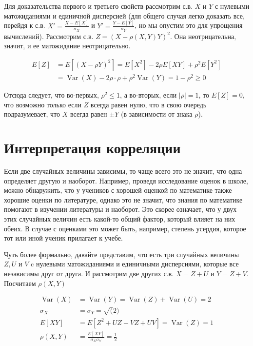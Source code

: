 \documentclass[12pt]{article}
\DeclareMathOperator{\Var}{Var}
\begin{document}
Для доказательства первого и третьего свойств рассмотрим с.в. $X$ и $Y$ с нулевыми матожиданиями и единичной дисперсией (для общего случая легко доказать все, перейдя к с.в. $X' = \frac{X - E[X]}{\sigma_X}$ и $Y' = \frac{Y - E[Y]}{\sigma_Y}$, но мы опустим это для упрощения вычислений). Рассмотрим с.в. $Z = (X - \rho(X, Y)Y)^2$. Она неотрицательна, значит, и ее матожидание неотрицательно.

\begin{align*}
  E[Z] &= E[(X - \rho Y)^2] = E[X^2] - 2\rho E[XY] + \rho^2 E[Y^2] \\
       &= \Var(X) - 2 \rho \cdot \rho + \rho^2 \Var(Y) = 1 - \rho^2 \ge 0   
\end{align*}

Отсюда следует, что во-первых, $\rho^2 \le 1$, а во-вторых, если $|\rho| = 1$, то $E[Z] = 0$, что возможно только если $Z$ всегда равен нулю, что в свою очередь подразумевает, что $X$ всегда равен $\pm Y$ (в зависимости от знака $\rho$).

\section{Интерпретация корреляции}

Если две случайных величины зависимы, то чаще всего это не значит, что одна определяет другую и наоборот. Например, проведя исследование оценок в школе, можно обнаружить, что у учеников с хорошей оценкой по математике также хорошие оценки по литературе, однако это не значит, что знания по математике помогают в изучении литературы и наоборот. Это скорее означает, что у двух этих случайных величин есть какой-то общий фактор, который влияет на них обеих. В случае с оценками это может быть, например, степень усердия, которое тот или иной ученик прилагает к учебе. 

Чуть более формально, давайте представим, что есть три случайных величины $Z, U$ и $V$ c нулевыми матожиданиями и единичными дисперсиями, которые все независимы друг от друга. И рассмотрим две других с.в. $X = Z + U$ и $Y = Z + V$. Посчитаем $\rho(X, Y)$

\begin{align*}
  \Var(X) &= \Var(Y) = \Var(Z) + \Var(U) = 2 \\
  \sigma_X &= \sigma_Y = \sqrt(2) \\
  E[XY] &= E[Z^2 + UZ + VZ + UV] = \Var(Z) = 1 \\
  \rho(X, Y) &= \frac{E[XY]}{\sigma_X \sigma_Y} = \frac{1}{2}
\end{align*}
\end{document}

